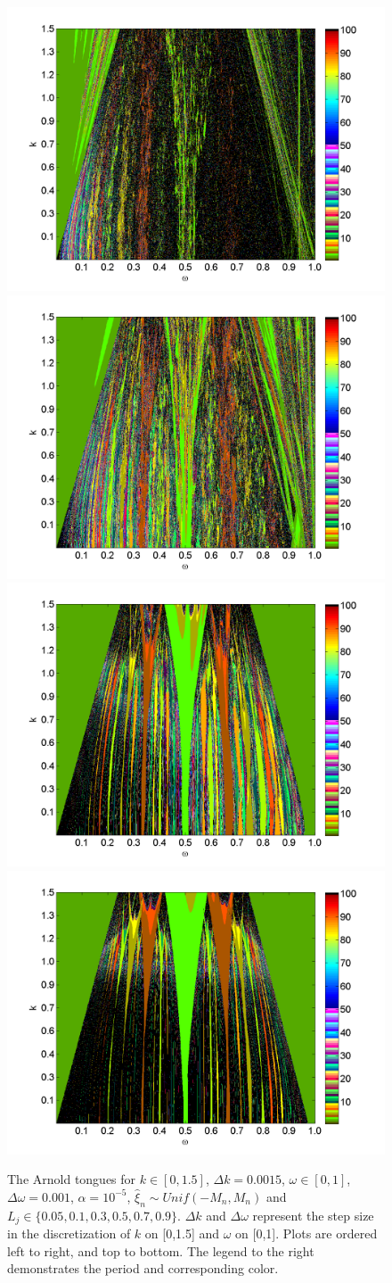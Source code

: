 \begin{figure}[H]\linespread{1}  
\caption[The Arnold tongues for the random circle map, uniform
distribution, $\alpha = 10^{-5}$]{The Arnold
  tongues for $k\in [0,1.5]$, $\Delta k = 0.0015$, $\omega \in [0,1]$,
  $\Delta \omega = 0.001$, $\alpha = 10^{-5}$, $\hat{\xi}_n\sim Unif(-M_n,M_n)$ and $L_j \in
  \{0.05,0.1,0.3,0.5,0.7,0.9\}$. $\Delta k$ and $\Delta \omega$
  represent the step size in the discretization of $k$ on [0,1.5] and $\omega$
  on [0,1]. Plots are ordered left to right,
  and top to bottom. The legend to the right demonstrates the period and corresponding color.}\label{fig:rcirctongues_u}
\centering
\includegraphics[width=.5\textwidth]{figs/tongues_1000_L_005.png}\hfill
\includegraphics[width=.5\textwidth]{figs/tongues_1000_L_01.png}\\
\includegraphics[width=.5\textwidth]{figs/tongues_1000_L_03.png}\hfill
\includegraphics[width=.5\textwidth]{figs/tongues_1000_L_05.png}\\

\end{figure}
